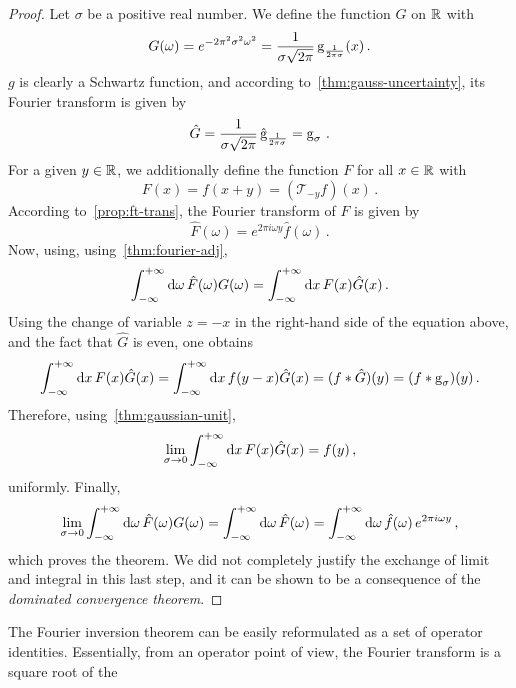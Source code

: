\begin{proof}
	Let $\sigma$ be a positive real number. We define the function $G$ on $\mathbb{R}$ with
	\begin{equation}
		G(\omega)=e^{-2\pi^2\sigma^2\omega^2}
		=\frac{1}{\sigma\sqrt{2\pi}}\operatorname{g}_{\frac{1}{2\pi\sigma}}(x)\,.
	\end{equation}
	$g$ is clearly a Schwartz function, and according to~\cref{thm:gauss-uncertainty}, its
	Fourier transform is given by
	\begin{equation}
		\hat{G}=\frac{1}{\sigma\sqrt{2\pi}}\,\hat{\operatorname{g}}_{\frac{1}{2\pi\sigma}}
		=\operatorname{g}_{\sigma}\,.
	\end{equation}
	For a given $y\in\mathbb{R}$, we additionally define the function $F$ for all $x\in\mathbb{R}$ with
	\begin{equation}
		F(x)=f(x+y)=(\mathcal{T}_{-y}f)(x)\,.
	\end{equation}
	According to~\cref{prop:ft-trans}, the Fourier transform of $F$ is given by
	\begin{equation}
		\hat{F}(\omega)=e^{2\pi i\omega y}\hat{f}(\omega)\,.
	\end{equation}
	Now, using, using~\cref{thm:fourier-adj},
	\begin{equation}
		\int_{-\infty}^{+\infty}\mathrm{d}{\omega}\,\hat{F}(\omega)G(\omega)=\int_{-\infty}^{+\infty}\mathrm{d}{x}\,F(x)\hat{G}(x)\,.
	\end{equation}
	Using the change of variable $z=-x$ in the right-hand side of the equation above, and
	the fact that $\hat{G}$ is even, one obtains
	\begin{equation}
		\int_{-\infty}^{+\infty}\mathrm{d}{x}\,F(x)\hat{G}(x)=\int_{-\infty}^{+\infty}\mathrm{d}{x}\,f(y-x)\hat{G}(x)=(f\ast\hat{G})(y)
		=(f\ast\operatorname{g}_{\sigma})(y)\,.
	\end{equation}
	Therefore, using~\cref{thm:gaussian-unit},
	\begin{equation}
		\lim_{\sigma\to 0}\int_{-\infty}^{+\infty}\mathrm{d}{x}\,F(x)\hat{G}(x)=f(y)\,,
	\end{equation}
	uniformly. Finally,
	\begin{equation}
		\lim_{\sigma\to 0}\int_{-\infty}^{+\infty}\mathrm{d}{\omega}\,\hat{F}(\omega)G(\omega)=
		\int_{-\infty}^{+\infty}\mathrm{d}{\omega}\,\hat{F}(\omega)=\int_{-\infty}^{+\infty}\mathrm{d}{\omega}\,\hat{f}(\omega)\,e^{2\pi i\omega y}\,,
	\end{equation}
	which proves the theorem. We did not completely justify the exchange of limit and
	integral in this last step, and it can be shown to be a consequence of the
	\emph{dominated convergence theorem}.
\end{proof}
The Fourier inversion theorem can be easily reformulated as a set of operator identities.
Essentially, from an operator point of view, the Fourier transform is a square root of the
